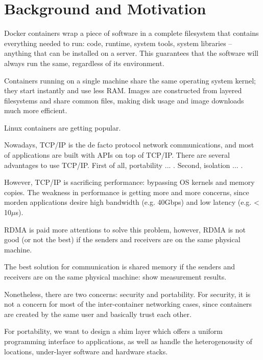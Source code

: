 \section{Background and Motivation}


Docker containers wrap a piece of software in a complete filesystem that contains everything needed to run: code, runtime, system tools, system libraries – anything that can be installed on a server. This guarantees that the software will always run the same, regardless of its environment.

Containers running on a single machine share the same operating system kernel; they start instantly and use less RAM. Images are constructed from layered filesystems and share common files, making disk usage and image downloads much more efficient.

Linux containers are getting popular. 

Nowadays, TCP/IP is the de facto protocol network communications, and most of applications
are built with APIs on top of TCP/IP. There are several advantages to use TCP/IP. First of all, 
portability ... . Second, isolation ... .

However, TCP/IP is sacrificing performance: bypassing OS kernels and memory copies.
The weakness in performance is getting more and more concerns, since morden applications
desire high bandwidth (e.g. 40Gbps) and low latency (e.g. < 10$\mu$s).



RDMA is paid more attentions to solve this problem, however, RDMA is not good (or not the best) if the senders and receivers
are on the same physical machine. 

The best solution for communication is shared memory if the senders and receivers are on the 
same physical machine: show measurement results.

Nonetheless, there are two concerns: security and portability.
For security, it is not a concern for most of the inter-container networking cases, since containers are created by the same user and basically trust each other.

For portability, we want to design a shim layer which offers a uniform programming interface to applications, as well as handle the heterogenousity of locations, under-layer software and hardware stacks.

